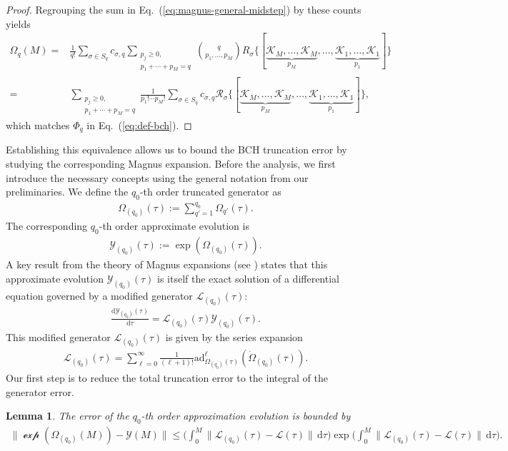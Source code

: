 \documentclass[11pt]{article}
\newtheorem{lemma}{Lemma}
\newcommand{\eq}[1]{(\ref{eq:#1})}
\renewcommand{\d}{\mathrm{d}}
\newcommand{\ad}{\mathrm{ad}}
\newcommand{\mc}{\mathcal}
\begin{document}
\begin{proof}
    Regrouping the sum in Eq.~\eq{magnus-general-midstep} by these counts yields
    \begin{align*}
         \Omega_q(M) = &\frac{1}{ q!}\sum_{\sigma\in S_q} c_{\sigma, q} \sum_{\substack{p_j \ge 0,\\ p_1+\cdots+p_M = q}} \binom{q}{p_1, \ldots, p_M} R_{\sigma}\{[\underbrace{\mc K_M, \ldots, \mc K_M}_{p_M}, \ldots, \underbrace{\mc K_1, \ldots, \mc K_1}_{p_1}]\} \\
         =&\sum_{\substack{p_j \ge 0,\\ p_1+\cdots+p_M = q}} \frac{1}{p_1!\cdots p_M!} \sum_{\sigma\in S_q} c_{\sigma, q} \mc R_{\sigma}\{[\underbrace{\mc K_M, \ldots, \mc K_M}_{p_M}, \ldots, \underbrace{\mc K_1, \ldots, \mc K_1}_{p_1}]\},
    \end{align*}
    which matches $\Phi_q$ in Eq.~\eq{def-bch}.

\end{proof}
Establishing this equivalence allows us to bound the BCH truncation error by studying the corresponding Magnus expansion. Before the analysis, we first introduce the necessary concepts using the general notation from our preliminaries.
We define the  $q_0$-th order truncated generator  as
\begin{align*}
 \Omega_{(q_0)}(\tau) := \sum_{q'=1}^{q_0} \Omega_{q'}(\tau).
\end{align*}
The corresponding $q_0$-th order approximate evolution is
\begin{align*}
 \mc Y_{(q_0)}(\tau):=\exp\left( \Omega_{(q_0)}(\tau) \right).
\end{align*}
A key result from the theory of Magnus expansions (see \cite[Section 3.2]{fang2025high}) states that this approximate evolution $\mc Y_{(q_0)}(\tau)$ is itself the exact solution of a differential equation governed by a modified generator $\mc{L}_{(q_0)}(\tau)$:
\begin{align*}
 \frac{\d \mc Y_{(q_0)}(\tau)}{\d \tau} = \mc{L}_{(q_0)}(\tau) \mc Y_{(q_0)}(\tau).
\end{align*}
This modified generator $\mc{L}_{(q_0)}(\tau)$ is given by the series expansion
\begin{align}
\label{eq:expansion-L-q}
 \mc{L}_{(q_0)}(\tau) = \sum_{\ell = 0}^{\infty}\frac{1}{(\ell+1)!}\ad_{\Omega_{(q_0)}(\tau)}^\ell(\dot{\Omega}_{(q_0)}(\tau)).
\end{align}
Our first step is to reduce the total truncation error to the integral of the generator error.
\begin{lemma}
\label{lem:error-reduction-general}
The error of the $q_0$-th order approximation evolution is bounded by
\begin{align*}
\|\mc \exp(\Omega_{(q_0)}(M)) -\mc Y(M)\| \le \bigg( \int_{0}^{M}\| \mc{L}_{(q_0)}(\tau)-\mc{L}(\tau)\|\,\d \tau\bigg)\exp\bigg(\int_{0}^{M}\| \mc{L}_{(q_0)}(\tau)-\mc{L}(\tau)\|\,\d \tau\bigg).
\end{align*}
\end{lemma}
\end{document}
